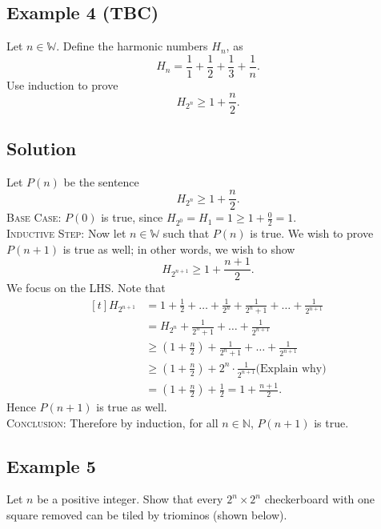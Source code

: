 \documentclass{article}
\begin{document}
\subsection*{Example 4 (TBC)}
    Let $n \in \mathbb{W}$. Define the harmonic numbers $H_{n}$, as $$H_{n} = \frac{1}{1} + \frac{1}{2} + \frac{1}{3} + \frac{1}{n}.$$ Use induction to prove $$H_{2^{n}} \ge 1 + \frac{n}{2}.$$

\subsection*{Solution}
    Let $P(n)$ be the sentence $$H_{2^{n}} \ge 1 + \frac{n}{2}.$$
    \textsc{Base Case}: $P(0)$ is true, since $H_{2^{0}} = H_{1} = 1 \ge 1 + \frac{0}{2} = 1$. \\
    \textsc{Inductive Step}: Now let $n \in \mathbb{W}$ such that $P(n)$ is true. We wish to prove $P(n + 1)$ is true as well; in other words, we wish to show $$H_{2^{n + 1}} \ge 1 + \frac{n + 1}{2}.$$ We focus on the LHS. Note that
    $$\begin{aligned}[t]
        H_{2^{n + 1}} &= 1 + \frac{1}{2} + \dots + \frac{1}{2^{n}} + \frac{1}{2^{n} + 1} + \dots + \frac{1}{2^{n + 1}} \\
        &= H_{2^{n}} + \frac{1}{2^{n} + 1} + \dots + \frac{1}{2^{n + 1}} \\
        &\ge \left(1 + \frac{n}{2}\right) + \frac{1}{2^{n} + 1} + \dots + \frac{1}{2^{n + 1}} \\
        &\ge \left(1 + \frac{n}{2}\right) + 2^{n} \cdot \frac{1}{2^{n + 1}} \text{(Explain why)} \\ 
        &= \left(1 + \frac{n}{2}\right) + \frac{1}{2} = 1 + \frac{n + 1}{2}.
    \end{aligned}$$
    Hence $P(n + 1)$ is true as well. \\
    \textsc{Conclusion}: Therefore by induction, for all $n \in \mathbb{N}$, $P(n + 1)$ is true.



\subsection*{Example 5}
    Let $n$ be a positive integer. Show that every $2^{n} \times 2^{n}$ checkerboard with one square removed can be tiled by triominos (shown below).
    
\end{document}
